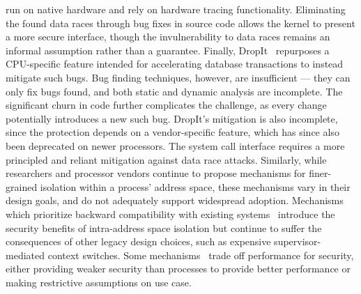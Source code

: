 run on native hardware and rely on hardware tracing functionality.
Eliminating the found data races through bug fixes in source code allows the
kernel to present a more secure interface, though the invulnerability to 
data races remains an informal assumption rather than a guarantee.
Finally, DropIt~\cite{schwartzDECAF} repurposes a CPU-specific feature
intended for accelerating database transactions to instead mitigate such
bugs.
Bug finding techniques, however, are insufficient --- they can only fix
bugs found, and both static and dynamic analysis are incomplete.
The significant churn in code further complicates the challenge, as every
change potentially introduces a new such bug.
DropIt's mitigation is also incomplete, since the protection depends on
a vendor-specific feature, which has since also been deprecated on newer
processors.
The system call interface requires a more principled and reliant
mitigation against data race attacks.
Similarly, while researchers and processor vendors continue to propose 
mechanisms for finer-grained isolation within a process' address space, 
these mechanisms vary in their design goals, and do not adequately
support widespread adoption.
Mechanisms which prioritize backward compatibility with existing 
systems~\cite{LittonVE0BD16, HsuHEP16, HedayatiGJCSSM19Hodor, LeeSK18, DuHXZC19XPC}
introduce the security benefits of intra-address space isolation
but continue to suffer the consequences of other legacy design choices, 
such as expensive supervisor-mediated context switches.
Some mechanisms~\cite{ParkLXMK19, HedayatiGJCSSM19Hodor} trade off 
performance for security, either providing weaker security than processes
to provide better performance or making restrictive assumptions on
use case.


